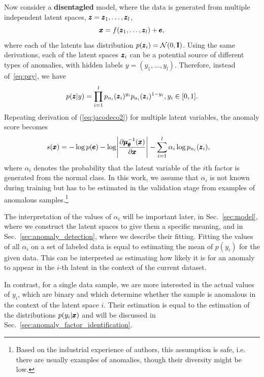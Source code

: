Now consider a \textbf{disentagled} model, where the data is generated from multiple independent latent spaces, $\pmb{{z}}=\pmb{{z}}_{1},\ldots,\pmb{{z}}_{l}$, 
\begin{equation} \label{eq:multilatent}
\pmb{{x}}=f(\pmb{{z}}_{1},\ldots,\pmb{{z}}_{l})+\pmb{{e}},
\end{equation}
where each of the latents has distribution $p(\pmb{{z}}_{i})=\mathcal{N}(0,\mathbf{I})$. Using the same derivations, each of the latent spaces $\pmb{{z}}_i$ can be a potential source of different types of anomalies, with hidden labels  $y=(y_{1},\ldots,y_{l})   $. Therefore, instead of~\eqref{eq:pzy},  we have
\begin{equation} 
p(\pmb{{z}}\vert y)= \prod_{i=1}^l p_{n_i}(\pmb{{z}}_i)^{y_i}p_{a_i}(\pmb{{z}}_i)^{1-y_i},y_i\in[0,1].
\end{equation}
Repeating derivation of (\ref{eq:jacodeco2}) for multiple latent variables, the anomaly score becomes
\begin{align} \label{eq:alphadeco}
s(\vc{x}) & = - \log p(\vc{e}) - \log\left\vert \frac{\partial \vc{\mu}_{\vc{\theta}}^{-1}(\vc{x})}{\partial \vc{x}}\right\vert  -  \sum_{i=1}^{l}\alpha_{i}\log p_{n_{i}}(\vc{z}_{i}),
\end{align}
where $\alpha_{i}$ denotes the probability that the latent variable of the $i$th factor is generated from the normal class. In this work, we assume that $\alpha_i$ is not known during training but has to be estimated in the validation stage from examples of anomalous samples.\footnote{Based on the industrial experience of authors, this assumption is safe, i.e. there are usually examples of anomalies, though their diversity might be low.}

The interpretation of the values of $\alpha_i$ will be important later, in Sec.~\ref{sec:model}, where we construct the latent spaces to give them a specific meaning, and in Sec.~\ref{sec:anomaly_detection}, where we describe their fitting. Fitting the values of all $\alpha_i$ on a set of labeled data is equal to estimating the mean of $p(y_i)$ for the given data. This can be interpreted as estimating how likely it is for an anomaly to appear in the $i$-th latent in the context of the current dataset. 

In contrast, for a single data sample, we are more interested in the actual values of $y_i$, which are binary and which determine whether the sample is anomalous in the context of the latent space $i$. Their estimation is equal to the estimation of the distributions $p(y_i \vert \pmb{{x}})$ and will be discussed in Sec.~\ref{sec:anomaly_factor_identification}. 

